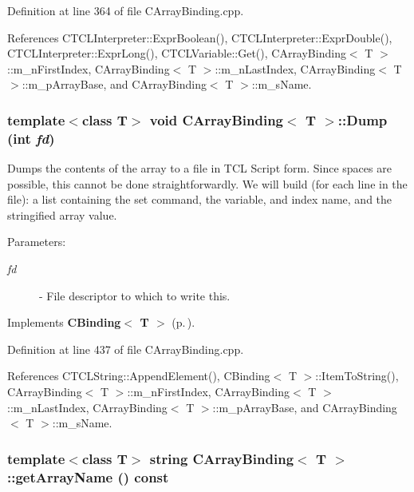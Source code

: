 Definition at line 364 of file CArray\-Binding.cpp.

References CTCLInterpreter::Expr\-Boolean(), CTCLInterpreter::Expr\-Double(), CTCLInterpreter::Expr\-Long(), CTCLVariable::Get(), CArray\-Binding$<$ T $>$::m\_\-n\-First\-Index, CArray\-Binding$<$ T $>$::m\_\-n\-Last\-Index, CArray\-Binding$<$ T $>$::m\_\-p\-Array\-Base, and CArray\-Binding$<$ T $>$::m\_\-s\-Name.
\subsubsection{\setlength{\rightskip}{0pt plus 5cm}template$<$class T$>$ void CArray\-Binding$<$ T $>$::Dump (int {\em fd})\hspace{0.3cm}{\tt  [virtual]}}\label{classCArrayBinding_a13}


Dumps the contents of the array to a file in TCL Script form. Since spaces are possible, this cannot be done straightforwardly. We will build (for each line in the file): a list containing the set command, the variable, and index name, and the stringified array value. \begin{Desc}
\item[Parameters: ]\par
\begin{description}
\item[{\em 
fd}]- File descriptor to which to write this. \end{description}
\end{Desc}


Implements {\bf CBinding$<$ T $>$} {\rm (p.\,\pageref{classCBinding_a2})}.

Definition at line 437 of file CArray\-Binding.cpp.

References CTCLString::Append\-Element(), CBinding$<$ T $>$::Item\-To\-String(), CArray\-Binding$<$ T $>$::m\_\-n\-First\-Index, CArray\-Binding$<$ T $>$::m\_\-n\-Last\-Index, CArray\-Binding$<$ T $>$::m\_\-p\-Array\-Base, and CArray\-Binding$<$ T $>$::m\_\-s\-Name.
\subsubsection{\setlength{\rightskip}{0pt plus 5cm}template$<$class T$>$ string CArray\-Binding$<$ T $>$::get\-Array\-Name () const\hspace{0.3cm}{\tt  [inline]}}\label{classCArrayBinding_a7}




